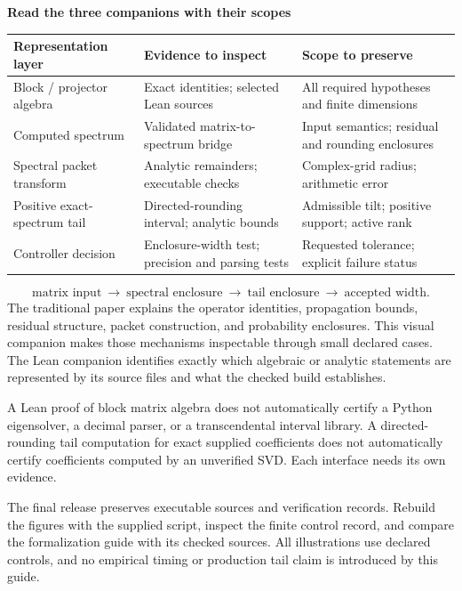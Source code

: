 \documentclass[11pt]{article}
\begin{document}
{\LARGE\bfseries\color{navy}Read the three companions with their scopes\par}
\vspace{3pt}
\vspace{5pt}\begin{center}\small\renewcommand{\arraystretch}{1.3}\begin{tabular}{@{}>{\raggedright\arraybackslash}p{.25\linewidth}>{\raggedright\arraybackslash}p{.33\linewidth}>{\raggedright\arraybackslash}p{.36\linewidth}@{}}\toprule
Representation layer & Evidence to inspect & Scope to preserve\\
\midrule
Block / projector algebra & Exact identities; selected Lean sources & All required hypotheses and finite dimensions\\
Computed spectrum & Validated matrix-to-spectrum bridge & Input semantics; residual and rounding enclosures\\
Spectral packet transform & Analytic remainders; executable checks & Complex-grid radius; arithmetic error\\
Positive exact-spectrum tail & Directed-rounding interval; analytic bounds & Admissible tilt; positive support; active rank\\
Controller decision & Enclosure-width test; precision and parsing tests & Requested tolerance; explicit failure status\\
\bottomrule\end{tabular}\end{center}
\[\text{matrix input}\ \longrightarrow\ \text{spectral enclosure}\ \longrightarrow\ \text{tail enclosure}\ \longrightarrow\ \text{accepted width}.\]
The traditional paper explains the operator identities, propagation bounds, residual structure, packet construction, and probability enclosures. This visual companion makes those mechanisms inspectable through small declared cases. The Lean companion identifies exactly which algebraic or analytic statements are represented by its source files and what the checked build establishes.

A Lean proof of block matrix algebra does not automatically certify a Python eigensolver, a decimal parser, or a transcendental interval library. A directed-rounding tail computation for exact supplied coefficients does not automatically certify coefficients computed by an unverified SVD. Each interface needs its own evidence.

The final release preserves executable sources and verification records. Rebuild the figures with the supplied script, inspect the finite control record, and compare the formalization guide with its checked sources. All illustrations use declared controls, and no empirical timing or production tail claim is introduced by this guide.
\end{document}
